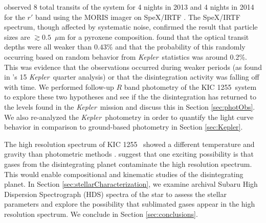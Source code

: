 \documentclass[preprint,trackchanges]{aastex61}
\newcommand{\shStar}{KIC 1255}
\newcommand{\kepler}{{\it Kepler}}
\begin{document}
\citet{schlawin2016kic1255} observed 8 total transits of the system for 4 nights in 2013 and 4 nights in 2014 for the $r'$ band using the MORIS imager \citep{Gulbis2011} on SpeX/IRTF \citep{rayner03}.
The SpeX/IRTF spectrum, though affected by systematic noise, confirmed the \citet{croll2014} result that particle sizes are $\gtrsim 0.5$~$\mu$m for a pyroxene composition.
\citet{schlawin2016kic1255} found that the optical transit depths were all weaker than $0.43\%$ and that the probability of this randomly occurring based on random behavior from \kepler\ statistics was around 0.2\%.
This was evidence that the observations occurred during weaker periods (as found in \citet{vanWerkhoven2014}'s 15 \kepler\ quarter analysis) or that the disintegration activity was falling off with time.
We performed follow-up $R$ band photometry of the \shStar\ system to explore these two hypotheses and see if the the disintegration has returned to the levels found in the \kepler\ mission and discuss this in Section \ref{sec:photObs}.
We also re-analyzed the \kepler\ photometry in order to quantify the light curve behavior in comparison to ground-based photometry in Section \ref{sec:Kepler}.

The high resolution spectrum of \shStar\ \citep{kawahara2013starspots} showed a different temperature and gravity than photometric methods \cite[e.g.][]{brown2011kic,huber2014kicprop}.
\citet{vanlieshout2016kic1255} suggest that one exciting possibility is that gases from the disintegrating planet contaminate the high resolution spectrum.
This would enable compositional and kinematic studies of the disintegrating planet.
In Section \ref{sec:stellarCharacterization}, we examine archival Subaru High Dispersion Spectrograph (HDS) spectra of the star to assess the stellar parameters and explore the possibility that sublimated gases appear in the high resolution spectrum.
We conclude in Section \ref{sec:conclusions}.
\end{document}
